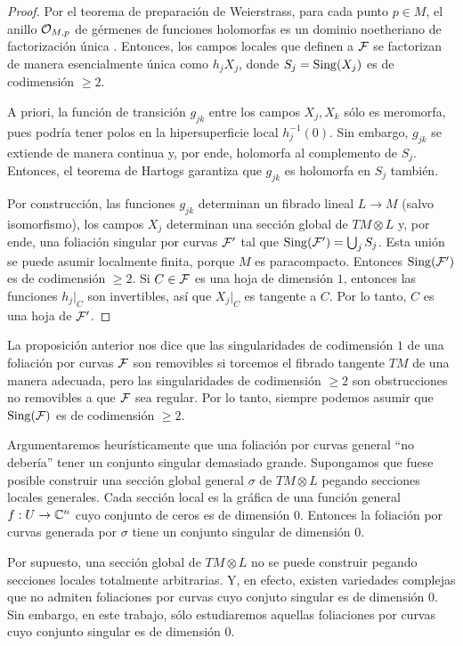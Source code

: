 \begin{proof}
Por el teorema de preparación de Weierstrass, para cada punto $p \in M$, el anillo $\mathcal O_{M,p}$ de gérmenes de funciones holomorfas es un dominio noetheriano \cite[pp. 70-71]{ebeling} de factorización única \cite[pp. 72-73]{ebeling}. Entonces, los campos locales que definen a $\mathcal F$ se factorizan de manera esencialmente única como $h_j X_j$, donde $S_j = \operatorname{Sing}(X_j)$ es de codimensión $\ge 2$.

A priori, la función de transición $g_{jk}$ entre los campos $X_j, X_k$ sólo es meromorfa, pues podría tener polos en la hipersuperficie local $h_j^{-1}(0)$. Sin embargo, $g_{jk}$ se extiende de manera continua y, por ende, holomorfa \cite[pp. 19-20]{gunning} al complemento de $S_j$. Entonces, el teorema de Hartogs garantiza que $g_{jk}$ es holomorfa en $S_j$ también.

Por construcción, las funciones $g_{jk}$ determinan un fibrado lineal $L \to M$ (salvo isomorfismo), los campos $X_j$ determinan una sección global de $TM \otimes L$ y, por ende, una foliación singular por curvas $\mathcal F'$ tal que $\operatorname{Sing}(\mathcal F') = \bigcup_j S_j$. Esta unión se puede asumir localmente finita, porque $M$ es paracompacto. Entonces $\operatorname{Sing}(\mathcal F')$ es de codimensión $\ge 2$. Si $C \in \mathcal F$ es una hoja de dimensión $1$, entonces las funciones $h_j \vert_C$ son invertibles, así que $X_j \vert_C$ es tangente a $C$. Por lo tanto, $C$ es una hoja de $\mathcal F'$.
\end{proof}

La proposición anterior nos dice que las singularidades de codimensión $1$ de una foliación por curvas $\mathcal F$ son removibles si torcemos el fibrado tangente $TM$ de una manera adecuada, pero las singularidades de codimensión $\ge 2$ son obstrucciones no removibles a que $\mathcal F$ sea regular. Por lo tanto, siempre podemos asumir que $\operatorname{Sing}(\mathcal F)$ es de codimensión $\ge 2$.

Argumentaremos heurísticamente que una foliación por curvas general ``no debería'' tener un conjunto singular demasiado grande. Supongamos que fuese posible construir una sección global general $\sigma$ de $TM \otimes L$ pegando secciones locales generales. Cada sección local es la gráfica de una función general $f : U \to \mathbb C^n$ cuyo conjunto de ceros es de dimensión $0$. Entonces la foliación por curvas generada por $\sigma$ tiene un conjunto singular de dimensión $0$.

Por supuesto, una sección global de $TM \otimes L$ no se puede construir pegando secciones locales totalmente arbitrarias. Y, en efecto, existen variedades complejas que no admiten foliaciones por curvas cuyo conjuto singular es de dimensión $0$. Sin embargo, en este trabajo, sólo estudiaremos aquellas foliaciones por curvas cuyo conjunto singular es de dimensión $0$.
